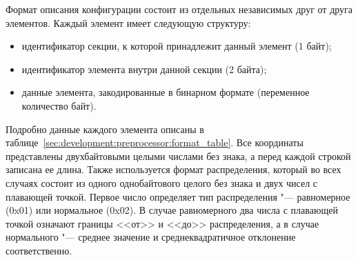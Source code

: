 Формат описания конфигурации состоит из отдельных независимых друг от друга элементов.
Каждый элемент имеет следующую структуру:
\begin{itemize}
  \item идентификатор секции, к которой принадлежит данный элемент (1 байт);
  \item идентификатор элемента внутри данной секции (2 байта);
  \item данные элемента, закодированные в бинарном формате (переменное количество байт).
\end{itemize}

Подробно данные каждого элемента описаны в таблице~\ref{sec:development:preprocessor:format_table}.
Все координаты представлены двухбайтовыми целыми числами без знака, а перед каждой строкой записана ее длина.
Также используется формат распределения, который во всех случаях состоит из одного однобайтового целого без знака и двух чисел с плавающей точкой.
Первое число определяет тип распределения "--- равномерное (0x01) или нормальное (0x02).
В случае равномерного два числа с плавающей точкой означают границы <<от>> и <<до>> распределения,
а в случае нормального "--- среднее значение и среднеквадратичное отклонение соответственно.

